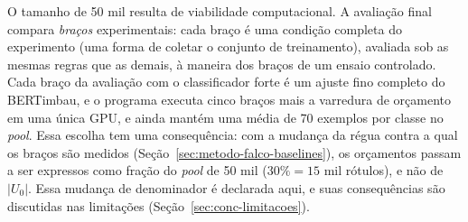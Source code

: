 O tamanho de 50 mil resulta de viabilidade computacional. A avaliação final
compara \emph{braços} experimentais: cada braço é uma condição completa do
experimento (uma forma de coletar o conjunto de treinamento), avaliada sob as
mesmas regras que as demais, à maneira dos braços de um ensaio controlado.
Cada braço da avaliação
com o classificador forte é um ajuste fino completo do BERTimbau, e o programa
executa cinco braços mais a varredura de orçamento em uma única GPU, e ainda
mantém uma média de 70 exemplos por classe no \textit{pool}. Essa
escolha tem uma consequência: com a mudança da régua
contra a qual os braços são medidos
(Seção~\ref{sec:metodo-falco-baselines}), os orçamentos passam a ser
expressos como fração do \textit{pool} de 50 mil ($30\% = 15$ mil rótulos),
e não de $|U_0|$. Essa mudança de denominador é declarada aqui, e suas
consequências são discutidas nas limitações
(Seção~\ref{sec:conc-limitacoes}).

